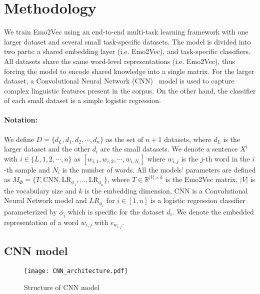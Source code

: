 \documentclass[11pt,a4paper]{article}
\begin{document}
\section{Methodology}
We train Emo2Vec using an end-to-end multi-task learning framework with one larger dataset and several small task-specific datasets. The model is divided into two parts: a shared embedding layer (i.e. Emo2Vec), and task-specific classifiers. All datasets share the same word-level representations (i.e. Emo2Vec), thus forcing the model to encode shared knowledge into a single matrix. For the larger dataset, a Convolutional Neural Network (CNN)~\cite{lecun1998gradient} model is used to capture complex linguistic features present in the corpus. On the other hand, the classifier of each small dataset is a simple logistic regression. 

\paragraph{Notation:} We define $D=\{d_{L},d_1, d_2, \cdots, d_n\}$ as the set of $n+1$ datasets, where $d_L$ is the larger dataset and the other $d_i$ are the small datasets. We denote a sentence $X^i$ with $i \in \{L, 1, 2, \cdots, n\}$ as ${[w_{i,1}, w_{i,2}, \cdots, w_{i,N_i}]}$ where $w_{i,j}$ is the $j$-th word in the $i$-th sample and $N_i$ is the number of words. All the models' parameters are defined as $M_\Phi=\{T, \text{CNN}, \text{LR}_{\phi_1}, \dots, \text{LR}_{\phi_n}\}$, where $T \in \mathbb{R}^{|V|\times k}$ is the Emo2Vec matrix, $|V|$ is the vocabulary size and $k$ is the embedding dimension, CNN is a Convolutional Neural Network model and $LR_{\phi_i}$ for $i \in [1, n]$ is a logistic regression classifier parameterized by $\phi_i $ which is specific for the dataset $d_i$. We denote the embedded representation of a word $w_{i,j}$ with ${e_{w_{i,j}}}$. 







\subsection{CNN model}
\begin{figure}[t]
  \centering
  \texttt{[image: CNN\_architecture.pdf]}
  \vspace{-10pt}
  
  \caption{Structure of CNN model}
  
  \vspace{-10pt}
  \label{fig:cnn_architecture}
\end{figure}
\end{document}
